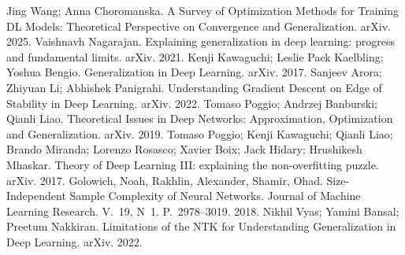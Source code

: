 Jing Wang; Anna Choromanska. A Survey of Optimization Methods for Training DL Models: Theoretical Perspective on Convergence and Generalization. arXiv. 2025.
 Vaishnavh Nagarajan. Explaining generalization in deep learning: progress and fundamental limits. arXiv. 2021.
 Kenji Kawaguchi; Leslie Pack Kaelbling; Yoshua Bengio. Generalization in Deep Learning. arXiv. 2017.
 Sanjeev Arora; Zhiyuan Li; Abhishek Panigrahi. Understanding Gradient Descent on Edge of Stability in Deep Learning. arXiv. 2022.
 Tomaso Poggio; Andrzej Banburski; Qianli Liao. Theoretical Issues in Deep Networks: Approximation, Optimization and Generalization. arXiv. 2019.
 Tomaso Poggio; Kenji Kawaguchi; Qianli Liao; Brando Miranda; Lorenzo Rosasco; Xavier Boix; Jack Hidary; Hrushikesh Mhaskar. Theory of Deep Learning III: explaining the non-overfitting puzzle. arXiv. 2017.
 Golowich, Noah, Rakhlin, Alexander, Shamir, Ohad. Size-Independent Sample Complexity of Neural Networks. Journal of Machine Learning Research. V.~19, N~1. P.~2978--3019. 2018.
 Nikhil Vyas; Yamini Bansal; Preetum Nakkiran. Limitations of the NTK for Understanding Generalization in Deep Learning. arXiv. 2022.
